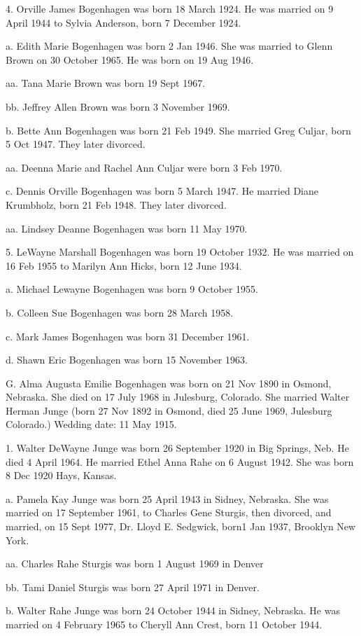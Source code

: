 \documentclass[a4paper]{article}
\begin{document}
4. Orville James Bogenhagen was born 18 March 1924.  He was married on 9 April 1944 to Sylvia Anderson, born 7 December 1924.
 
a. Edith Marie Bogenhagen was born 2 Jan 1946.  She was married to Glenn Brown on 30 October 1965.  He was born on 19 Aug 1946.

aa. Tana Marie Brown was born 19 Sept 1967.

bb. Jeffrey Allen Brown was born 3 November 1969.

b. Bette Ann Bogenhagen was born  21 Feb 1949.  She married Greg Culjar, born 5 Oct 1947.  They later divorced.

aa. Deenna Marie and Rachel Ann Culjar were born 3 Feb 1970.

c. Dennis Orville Bogenhagen was born 5 March 1947.  He married Diane Krumbholz, born 21 Feb 1948.  They later divorced.
 
aa. Lindsey Deanne Bogenhagen was born 11 May 1970.

5. LeWayne Marshall Bogenhagen was born 19 October 1932.  He was married on 16 Feb 1955 to Marilyn Ann Hicks, born 12 June 1934.
 
a. Michael Lewayne Bogenhagen was born 9 October 1955.

b. Colleen Sue Bogenhagen was born 28 March 1958.

c. Mark James Bogenhagen was born 31 December 1961.

d. Shawn Eric Bogenhagen was born 15 November 1963.  

G. Alma Augusta Emilie Bogenhagen was born on 21 Nov 1890 in Osmond, Nebraska. She died on 17 July 1968 in Julesburg, Colorado.  She married Walter Herman Junge (born 27 Nov 1892 in Osmond, died 25 June 1969, Julesburg Colorado.) Wedding date: 11 May 1915.

1. Walter DeWayne Junge was born 26 September 1920 in Big Springs, Neb. He died 4 April 1964.	He married Ethel Anna Rahe on 6 August 1942.  She was born 8 Dec 1920 Hays, Kansas.

a. Pamela Kay Junge was born 25 April 1943 in Sidney, Nebraska.  She was married on 17 September 1961, to Charles Gene Sturgis, then divorced, and married, on 15 Sept 1977, Dr. Lloyd E. Sedgwick, born1 Jan 1937, Brooklyn New York.

aa. Charles Rahe Sturgis was born 1 August 1969 in Denver

bb. Tami Daniel Sturgis was born 27 April 1971 in Denver.

b. Walter Rahe Junge was born 24 October 1944 in Sidney, Nebraska.  He was married on 4 February 1965 to Cheryll Ann Crest, born 11 October 1944.
  
\end{document}
